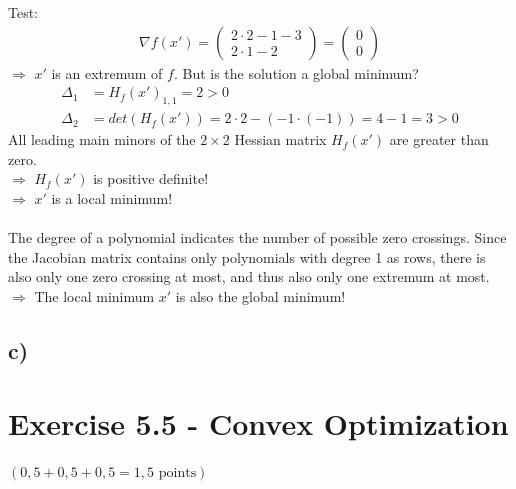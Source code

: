 \documentclass[a4paper]{article}
\begin{document}
        Test:
        \begin{align}
            \nabla f(x') = \left( \begin{matrix} 2 \cdot 2 - 1 - 3 \\ 2 \cdot 1 -2 \end{matrix} \right) = \left( \begin{matrix} 0 \\ 0 \end{matrix} \right)
        \end{align}
        $\Rightarrow$ $x'$ is an extremum of $f$.
        But is the solution a global minimum?
        \begin{align}
            \Delta_1 &= H_f(x')_{1,1} = 2 > 0\\
            \Delta_2 &= det(H_f(x')) = 2 \cdot 2 - (-1 \cdot (-1)) = 4-1 = 3 > 0
        \end{align}
        All leading main minors of the $2 \times 2$ Hessian matrix $H_f(x')$ are greater than zero.\\
        $\Rightarrow$ $H_f(x')$ is positive definite!\\
        $\Rightarrow$ $x'$ is a local minimum!\\\\
        The degree of a polynomial indicates the number of possible zero crossings.
        Since the Jacobian matrix contains only polynomials with degree 1 as rows, there is also only one zero crossing at most, and thus also only one extremum at most.\\
        $\Rightarrow$ The local minimum $x'$ is also the global minimum!
        
    \subsection*{c)}
    
    



\newpage
\section*{Exercise 5.5 - Convex Optimization}
$(0,5+0,5+0,5 = 1,5 \text{ points})$
\end{document}
